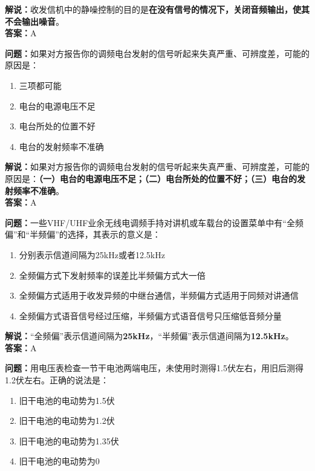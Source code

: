 \textbf{解说：}收发信机中的静噪控制的目的是\textbf{在没有信号的情况下，关闭音频输出，使其不会输出噪音}。\\\textbf{答案：}A%

\textbf{问题：}如果对方报告你的调频电台发射的信号听起来失真严重、可辨度差，可能的原因是：

\begin{enumerate}[label=\Alph*), leftmargin=1cm]
	\item 三项都可能
	\item 电台的电源电压不足
	\item 电台所处的位置不好
	\item 电台的发射频率不准确
\end{enumerate}

\textbf{解说：}如果对方报告你的调频电台发射的信号听起来失真严重、可辨度差，可能的原因是：\textbf{（一）电台的电源电压不足；（二）电台所处的位置不好；（三）电台的发射频率不准确}。\\\textbf{答案：}A%


\textbf{问题：}一些VHF/UHF业余无线电调频手持对讲机或车载台的设置菜单中有“全频偏”和“半频偏”的选择，其表示的意义是：

\begin{enumerate}[label=\Alph*), leftmargin=1cm]
	\item 分别表示信道间隔为25kHz或者12.5kHz
	\item 全频偏方式下发射频率的误差比半频偏方式大一倍
	\item 全频偏方式适用于收发异频的中继台通信，半频偏方式适用于同频对讲通信
	\item 全频偏方式语音信号经过压缩，半频偏方式语音信号只压缩低音频分量
\end{enumerate}

\textbf{解说：}“全频偏”表示信道间隔为\textbf{25kHz}，“半频偏”表示信道间隔为\textbf{12.5kHz}。\\\textbf{答案：}A%


\textbf{问题：}用电压表检查一节干电池两端电压，未使用时测得1.5伏左右，用旧后测得1.2伏左右。正确的说法是：

\begin{enumerate}[label=\Alph*), leftmargin=1cm]
	\item 旧干电池的电动势为1.5伏
	\item 旧干电池的电动势为1.2伏
	\item 旧干电池的电动势为1.35伏
	\item 旧干电池的电动势为0
\end{enumerate}

